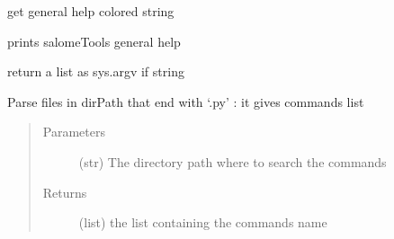 \documentclass[a4paper,10pt,english]{sphinxmanual}
\begin{document}
\begin{fulllineitems}
\begin{fulllineitems}
\end{fulllineitems}


\begin{fulllineitems}
\label{\detokenize{apidoc_src/src:src.salomeTools.Sat.get_help}}
get general help colored string

\end{fulllineitems}


\begin{fulllineitems}
\label{\detokenize{apidoc_src/src:src.salomeTools.Sat.parseArguments}}
\end{fulllineitems}


\begin{fulllineitems}
\label{\detokenize{apidoc_src/src:src.salomeTools.Sat.print_help}}
prints salomeTools general help

\end{fulllineitems}


\end{fulllineitems}


\begin{fulllineitems}
\label{\detokenize{apidoc_src/src:src.salomeTools.assumeAsList}}
return a list as sys.argv if string

\end{fulllineitems}


\begin{fulllineitems}
\label{\detokenize{apidoc_src/src:src.salomeTools.find_command_list}}
Parse files in dirPath that end with ‘.py’ : it gives commands list
\begin{quote}\begin{description}
\item[{Parameters}] \leavevmode
{} \textendash{} (str) The directory path where to search the commands

\item[{Returns}] \leavevmode
(list) the list containing the commands name

\end{description}\end{quote}

\end{fulllineitems}
\end{document}
